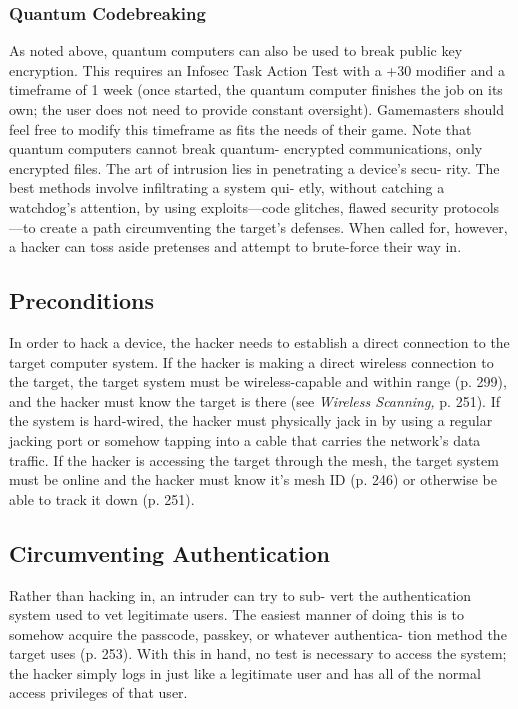 \subsubsection{Quantum Codebreaking}

As noted above, quantum computers can also be used 
to break public key encryption. This requires an Infosec 
Task Action Test with a +30 modifier and a timeframe 
of 1 week (once started, the quantum computer finishes 
the job on its own; the user does not need to provide 
constant oversight). Gamemasters should feel free to 
modify this timeframe as fits the needs of their game. 
Note that quantum computers cannot break quantum-
encrypted communications, only encrypted files.
The art of intrusion lies in penetrating a device's secu-
rity. The best methods involve infiltrating a system qui-
etly, without catching a watchdog's attention, by using 
exploits—code glitches, flawed security protocols—to 
create a path circumventing the target's defenses. When 
called for, however, a hacker can toss aside pretenses 
and attempt to brute-force their way in.

\subsection{Preconditions}

In order to hack a device, the hacker needs to establish 
a direct connection to the target computer system. If 
the hacker is making a direct wireless connection to 
the target, the target system must be wireless-capable 
and within range (p. 299), and the hacker must know 
the target is there (see \textit{Wireless Scanning,} p. 251). If 
the system is hard-wired, the hacker must physically 
jack in by using a regular jacking port or somehow 
tapping into a cable that carries the network's data 
traffic. If the hacker is accessing the target through the 
mesh, the target system must be online and the hacker 
must know it's mesh ID (p. 246) or otherwise be able 
to track it down (p. 251).

\subsection{Circumventing Authentication}

Rather than hacking in, an intruder can try to sub-
vert the authentication system used to vet legitimate 
users. The easiest manner of doing this is to somehow 
acquire the passcode, passkey, or whatever authentica-
tion method the target uses (p. 253). With this in hand, 
no test is necessary to access the system; the hacker 
simply logs in just like a legitimate user and has all of 
the normal access privileges of that user.

